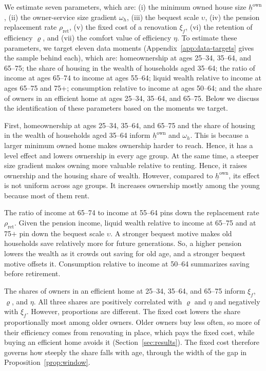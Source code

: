 We estimate seven parameters, which are: (i) the minimum owned house size
$\underline h^{\mathrm{own}}$, (ii) the owner-service size gradient $\omega_h$, (iii)
the bequest scale $\upsilon$, (iv) the pension replacement rate
$\rho_{\mathrm{ret}}$, (v) the fixed cost of a renovation $\xi_f$, (vi) the
retention of efficiency $\varrho$, and (vii) the comfort value of efficiency
$\eta$. To estimate these parameters, we target eleven data moments (Appendix~\ref{app:data-targets} gives the sample behind each), which are:
 homeownership at ages 25--34, 35--64, and 65--75; the share of
housing in the wealth of households aged 35--64; the ratio of income at
ages 65--74 to income at ages 55--64; liquid wealth relative to income at
ages 65--75 and 75+; consumption relative to income at ages 50--64; and the
share of owners in an efficient home at ages 25--34, 35--64, and 65--75. Below we discuss the identification of these parameters based on the moments we target.


First, homeownership at ages 25--34, 35--64, and 65--75 and the share of housing in
the wealth of households aged 35--64 inform $\underline h^{\mathrm{own}}$
and $\omega_h$. This is because a larger minimum owned home makes ownership harder to
reach. Hence, it has a level effect and lowers ownership in every age group. At the same time, a steeper size gradient makes
owning more valuable relative to renting. Hence, it raises ownership and the
housing share of wealth. However, compared to $\underline h^{\mathrm{own}}$, its effect is not uniform across age groups. It increases ownership mostly among the young because most of them rent. 

The ratio of income at 65--74 to income at 55--64 pins down the replacement
rate $\rho_{\mathrm{ret}}$. Given the pension income, liquid wealth relative to
income at 65--75 and at 75$+$ pin down the bequest scale $\upsilon$. A
stronger bequest motive makes old households save relatively more for future generations. So, a higher pension lowers the wealth as it crowds out saving for old age, and a
stronger bequest motive offsets it. Consumption relative to income at 50--64 summarizes
saving before retirement.


The  shares of owners in an efficient home at 25--34, 35--64, and 65--75
inform $\xi_f$, $\varrho$, and $\eta$. All three shares are positively correlated  with $\varrho$
and $\eta$ and negatively with $\xi_f$. However, proportions are different. The
fixed cost lowers the share proportionally most among older owners. Older
owners buy less often, so more of their efficiency comes from renovating in
place, which pays the fixed cost, while buying an efficient home avoids it
(Section~\ref{sec:results}). The fixed cost therefore governs how steeply
the share falls with age, through the width of the  gap in
Proposition~\ref{prop:window}.

